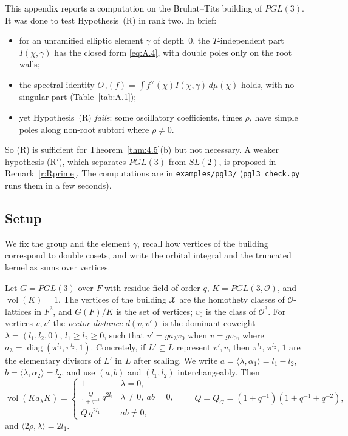 \documentclass[12pt,letterpaper]{article}
\numberwithin{equation}{section}
\theoremstyle{plain}
\theoremstyle{remark}
\theoremstyle{plain}
\theoremstyle{definition}
\theoremstyle{remark}
\theoremstyle{remark}
\newcommand{\OO}{\mathcal{O}}
\newcommand{\ip}[1]{\langle #1\rangle}
\DeclareMathOperator{\vol}{vol}
\DeclareMathOperator{\diag}{diag}
\begin{document}
This appendix reports a computation on the Bruhat--Tits building of $PGL(3)$. It was done to test Hypothesis~(R) in rank two. In brief:
\begin{itemize}
\item for an unramified elliptic element $\gamma$ of depth~$0$, the $T$-independent part $I(\chi,\gamma)$ has the closed form \eqref{eq:A.4}, with double poles only on the root walls;
\item the spectral identity $O_\gamma(f)=\int f^\vee(\chi)I(\chi,\gamma)\,d\mu(\chi)$ holds, with no singular part (Table~\ref{tab:A.1});
\item yet Hypothesis~(R) \emph{fails}: some oscillatory coefficients, times $\rho$, have simple poles along non-root subtori where $\rho\ne0$.
\end{itemize}
So (R) is sufficient for Theorem~\ref{thm:4.5}(b) but not necessary. A weaker hypothesis (R$'$), which separates $PGL(3)$ from $SL(2)$, is proposed in Remark~\ref{r:Rprime}. The computations are in \texttt{examples/pgl3/} (\texttt{pgl3\_check.py} runs them in a few seconds).

\subsection{Setup}\label{sec:A.1}

We fix the group and the element $\gamma$, recall how vertices of the building correspond to double cosets, and write the orbital integral and the truncated kernel as sums over vertices.


Let $G=PGL(3)$ over $F$ with residue field of order $q$, $K=PGL(3,\OO)$, and $\vol(K)=1$. The vertices of the building $\mathcal X$ are the homothety classes of $\OO$-lattices in $F^3$, and $G(F)/K$ is the set of vertices; $v_0$ is the class of $\OO^3$. For vertices $v,v'$ the \emph{vector distance} $d(v,v')$ is the dominant coweight $\lambda=(l_1,l_2,0)$, $l_1\ge l_2\ge0$, such that $v'=g a_\lambda v_0$ when $v=gv_0$, where $a_\lambda=\diag(\pi^{l_1},\pi^{l_2},1)$. Concretely, if $L'\subseteq L$ represent $v',v$, then $\pi^{l_1}$, $\pi^{l_2}$, $1$ are the elementary divisors of $L'$ in $L$ after scaling. We write $a=\ip{\lambda,\alpha_1}=l_1-l_2$, $b=\ip{\lambda,\alpha_2}=l_2$, and use $(a,b)$ and $(l_1,l_2)$ interchangeably. Then
\begin{equation}\label{eq:A.1}
\vol(Ka_\lambda K)=\begin{cases}1&\lambda=0,\\ \frac{Q}{1+q^{-1}}\,q^{2l_1}&\lambda\ne0,\ ab=0,\\ Q\,q^{2l_1}&ab\ne0,\end{cases}\qquad Q=Q_G=(1+q^{-1})(1+q^{-1}+q^{-2}),
\end{equation}
and $\ip{2\rho,\lambda}=2l_1$.
\end{document}
